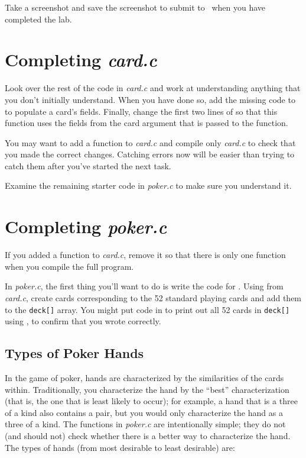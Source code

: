Take a screenshot and save the screenshot to submit to \filesubmission\ when you
have completed the lab.

\section{Completing \textit{card.c}}

Look over the rest of the code in \textit{card.c} and work at understanding
anything that you don't initially understand. When you have done so, add the
missing code to  to populate a card's fields.
Finally, change the first two lines of  so
that this function uses the fields from the card argument that is passed to the
function.

You may want to add a  function to \textit{card.c} and compile
only \textit{card.c} to check that you made the correct changes. Catching
errors now will be easier than trying to catch them after you've started the
next task.

Examine the remaining starter code in \textit{poker.c} to make sure you
understand it.

\section{Completing \textit{poker.c}}

If you added a  function to \textit{card.c}, remove it so that
there is only one  function when you compile the full program.

In \textit{poker.c}, the first thing you'll want to do is write the code for
. Using  from \textit{card.c},
create cards corresponding to the 52 standard playing cards and add them to the
\lstinline{deck[]} array. You might put code in  to print out
all 52 cards in \lstinline{deck[]} using , to confirm
that you wrote  correctly.

\subsection{Types of Poker Hands}

In the game of poker, hands are characterized by the similarities of the cards
within. Traditionally, you characterize the hand by the ``best''
characterization (that is, the one that is least likely to occur); for example,
a hand that is a three of a kind also contains a pair, but you would only
characterize the hand as a three of a kind. The  functions in
\textit{poker.c} are intentionally simple; they do not (and should not) check
whether there is a better way to characterize the hand. The types of hands
(from most desirable to least desirable) are:


